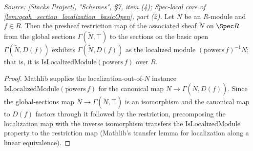 \begin{lemma}
  \label{lem:isLocalizedModule_tilde_restrict}
  \textit{Source: [Stacks Project], "Schemes", \S 7, item (4); Spec-local core of
  \cref{lem:qcoh_section_localization_basicOpen}, part (2).}
  Let \(N\) be an \(R\)-module and \(f \in R\). Then the presheaf restriction map of the
  associated sheaf \(\widetilde{N}\) on \(\Spec R\) from the global sections
  \(\Gamma(\widetilde{N}, \top)\) to the sections on the basic open \(\Gamma(\widetilde{N}, D(f))\)
  exhibits \(\Gamma(\widetilde{N}, D(f))\) as the localized module
  \((\mathrm{powers}\,f)^{-1} N\); that is, it is \(\mathrm{IsLocalizedModule}(\mathrm{powers}\,f)\)
  over \(R\).
\end{lemma}
\begin{proof}
  Mathlib supplies the localization-out-of-\(N\) instance
  \(\mathrm{IsLocalizedModule}(\mathrm{powers}\,f)\) for the canonical map
  \(N \to \Gamma(\widetilde N, D(f))\). Since the global-sections map
  \(N \to \Gamma(\widetilde N, \top)\) is an isomorphism and the canonical map to \(D(f)\) factors
  through it followed by the restriction, precomposing the localization map with the inverse
  isomorphism transfers the \(\mathrm{IsLocalizedModule}\) property to the restriction map
  (Mathlib's transfer lemma for localization along a linear equivalence).
\end{proof}

